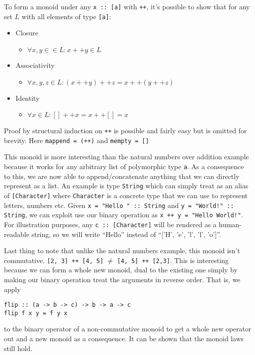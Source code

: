 \documentclass{acm_proc_article-sp}
\begin{document}
To form a monoid under any \texttt{x :: [a]} with \texttt{++}, it's possible to show
that for any set $L$ with all elements of type \texttt{[a]}:
\begin{itemize}
\item Closure
  \begin{itemize}
  \item $\forall x,y \in \in L: x ++ y \in L$
  \end{itemize}
\item Associativity
  \begin{itemize}
  \item $\forall x,y,z \in L: (x ++ y) ++ z = x ++ (y ++ z)$
  \end{itemize}
\item Identity
  \begin{itemize}
  \item $\forall x \in L: [] ++ x = x ++ [] = x$
  \end{itemize}
\end{itemize}
Proof by structural induction on \texttt{++} is possible and fairly easy but
is omitted for brevity. Here \texttt{mappend = (++)} and \texttt{mempty = []}

This monoid is more interesting than the natural numbers over addition
example because it works for any arbitrary list of polymorphic type
\texttt{a}. As a consequence to this, we are now able to append/concatenate
anything that we can directly represent as a list. An example is type
\texttt{String} which can simply treat as an alias of \texttt{[Character]} where \texttt{Character}
is a concrete type that we can use to represent letters, numbers
etc. Given \texttt{x = "Hello " :: String} and
\texttt{y = "World!" :: String}, we
can exploit use our binary operation as \texttt{x ++ y = "Hello World!"}. For
illustration purposes, any \texttt{c :: [Character]} will be rendered as a
human-readable string, so we will write ``Hello'' instead of ``['H',
'e', 'l', 'l', 'o']''.

Last thing to note that unlike the natural numbers example, this
monoid isn't commutative.
\texttt{[2, 3] ++ [4, 5]} $\neq$ \texttt{[4, 5] ++ [2,3]}.
This is interesting because we can form a whole new monoid, dual
to the existing one simply by making our binary operation treat the
arguments in reverse order. That is, we apply
\begin{lstlisting}
flip :: (a -> b -> c) -> b -> a -> c
flip f x y = f y x
\end{lstlisting}
to the binary operator of a non-commutative monoid to get a whole new
operator out and a new monoid as a consequence. It can be shown that
the monoid laws still hold.
\end{document}
